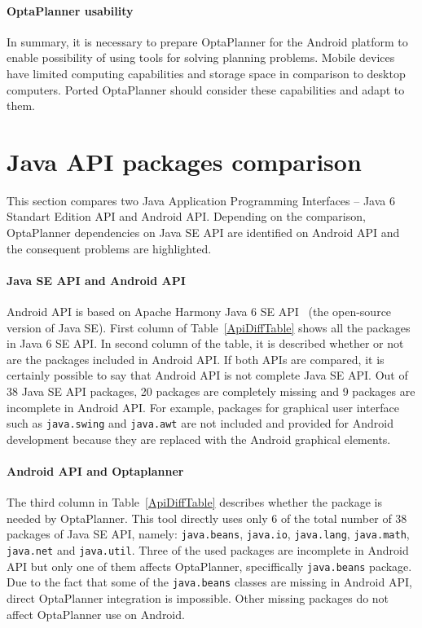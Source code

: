 \paragraph{OptaPlanner usability}
In summary, it is necessary to prepare OptaPlanner for the Android platform to enable possibility of using tools for
solving planning problems. Mobile devices have limited computing capabilities and storage space in comparison to desktop
computers. Ported OptaPlanner should consider these capabilities and adapt to them.

\section{Java API packages comparison}\label{ComparsionSection}
This section compares two Java Application Programming Interfaces -- Java 6 Standart Edition API and Android API.
Depending on the comparison, OptaPlanner dependencies on Java SE API are identified on Android API and the consequent
problems are highlighted.

\paragraph{Java SE API and Android API}
Android API is based on Apache Harmony Java 6 SE API~\cite{Apache} (the open-source version of Java SE). First column of
Table~\ref{ApiDiffTable} shows all the packages in Java 6 SE API. In second column of the table, it is described whether
or not are the packages included in Android API. If both APIs are compared, it is certainly possible to say that Android
API is not complete Java SE API. Out of 38 Java SE API packages, 20 packages are completely missing and 9 packages are
incomplete in Android API. For example, packages for graphical user interface such as \texttt{java.swing} and
\texttt{java.awt} are not included and provided for Android development because they are replaced with the Android
graphical elements.

\paragraph{Android API and Optaplanner}
The third column in Table~\ref{ApiDiffTable} describes whether the package is needed by OptaPlanner. This tool directly
uses only 6 of the total number of 38 packages of Java SE API, namely: \texttt{java.beans}, \texttt{java.io},
\texttt{java.lang}, \texttt{java.math}, \texttt{java.net} and \texttt{java.util}. Three of the used packages are
incomplete in Android API but only one of them affects OptaPlanner, speciffically \texttt{java.beans} package. Due to
the fact that some of the \texttt{java.beans} classes are missing in Android API, direct OptaPlanner integration is
impossible. Other missing packages do not affect OptaPlanner use on Android.


